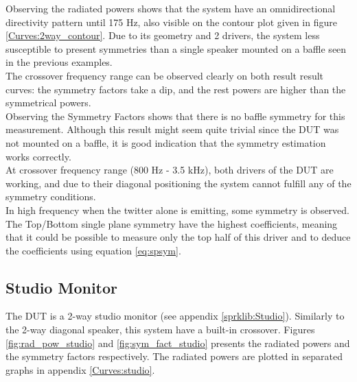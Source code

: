 \documentclass{report}
\begin{document}
\vspace{0.1cm}

Observing the radiated powers shows that the system have an omnidirectional directivity pattern until 175 Hz, also visible on the contour plot given in figure \ref{Curves:2way_contour}. Due to its geometry and 2 drivers, the system less susceptible to present symmetries than a single speaker mounted on a baffle seen in the previous examples.\\
The crossover frequency range can be observed clearly on both result result curves: the symmetry factors take a dip, and the rest powers are higher than the symmetrical powers. \\

Observing the Symmetry Factors shows that there is no baffle symmetry for this measurement. Although this result might seem quite trivial since the DUT was not mounted on a baffle, it is good indication that the symmetry estimation works correctly. \\
At crossover frequency range (800 Hz - 3.5 kHz), both drivers of the DUT are working, and due to their diagonal positioning the system cannot fulfill any of the symmetry conditions.\\

In high frequency when the twitter alone is emitting, some symmetry is observed. The Top/Bottom single plane symmetry have the highest coefficients, meaning that it could be possible to measure only the top half of this driver and to deduce the coefficients using equation \ref{eq:spsym}.\\



\subsection{Studio Monitor}
 The DUT is a 2-way studio monitor (see appendix \ref{sprklib:Studio}). Similarly to the 2-way diagonal speaker, this system have a built-in crossover. Figures \ref{fig:rad_pow_studio} and \ref{fig:sym_fact_studio} presents the radiated powers and the symmetry factors respectively.  The radiated powers are plotted in separated graphs in appendix \ref{Curves:studio}.
\end{document}
